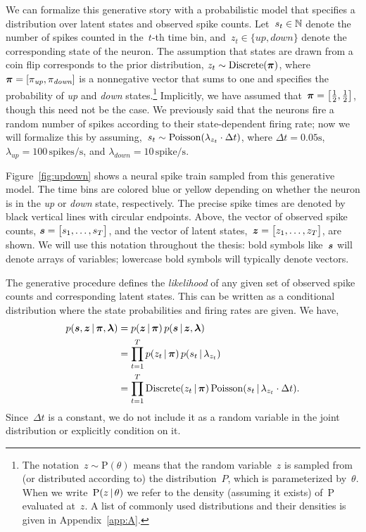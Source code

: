 \sloppy We can formalize this generative story with a probabilistic
model that specifies a distribution over latent states and observed
spike counts. Let~$s_t \in \mathbb{N}$ denote the number of spikes
counted in the~$t$-th time bin, and~$z_t \in \{\textit{up},
\textit{down}\}$ denote the corresponding state of the neuron. The
assumption that states are drawn from a coin flip corresponds to the
prior distribution, ${z_t \sim \mathrm{Discrete}(\boldsymbol{\pi})}$, where~${\boldsymbol{\pi} =
  [\pi_{\textit{up}}, \pi_{\textit{down}}]}$ is a nonnegative vector
that sums to one and specifies the probability of \textit{up} and
\textit{down} states.\footnote{The notation~${z \sim
    \mathrm{P}(\theta)}$ means that the random variable~$z$ is sampled
  from (or distributed according to) the distribution~$P$, which is
  parameterized by~$\theta$. When we write~${\mathrm{P}(z \,|\,
    \theta)}$ we refer to the density (assuming it exists)
  of~$\mathrm{P}$ evaluated at~$z$.  A list of commonly used
  distributions and their densities is given in Appendix~\ref{app:A}.}
Implicitly, we have assumed that~${\boldsymbol{\pi}=\big[\tfrac{1}{2},
    \tfrac{1}{2} \big]}$, though this need not be the case.  We
previously said that the neurons fire a random number of spikes
according to their state-dependent firing rate; now we will formalize
this by assuming,~${s_{t} \sim \mathrm{Poisson}(\lambda_{z_t} \cdot \Delta
  t)}$, where ${\Delta t = 0.05\text{s}}$, ${\lambda_{\textit{up}} =
  100\,\text{spikes/s}}$, and ${\lambda_{\textit{down}} =
  10\,\text{spike/s}}$.

Figure~\ref{fig:updown} shows a neural spike train sampled from this
generative model. The time bins are colored blue or yellow depending
on whether the neuron is in the \textit{up} or \textit{down} state,
respectively.  The precise spike times are denoted by black vertical
lines with circular endpoints. Above, the vector of observed spike
counts, ${\boldsymbol{s} = \big[s_1, \ldots, s_T \big]}$, and the vector of
latent states,~${\boldsymbol{z} = \big[z_1, \ldots, z_T \big]}$, are shown.  We
will use this notation throughout the thesis: bold symbols like~$\boldsymbol{s}$
will denote arrays of variables; lowercase bold symbols will
typically denote vectors.

The generative procedure defines the \emph{likelihood} of any given
set of observed spike counts and corresponding latent states. This can
be written as a conditional distribution where the state probabilities
and firing rates are given. We have,
\begin{align}
  \label{eq:lkhd_chain_rule}
  p(\boldsymbol{s}, \boldsymbol{z} \,|\, \boldsymbol{\pi}, \boldsymbol{\lambda}) 
  &= p(\boldsymbol{z} \,|\, \boldsymbol{\pi}) \, p(\boldsymbol{s} \,|\, \boldsymbol{z}, \boldsymbol{\lambda}) \\
  \label{eq:lkhd_factorized}
  &= \prod_{t=1}^T p(z_t \,|\, \boldsymbol{\pi}) \, p(s_t \,|\, \lambda_{z_t}) \\
  \label{eq:lkhd_factorized_forms}
  &= \prod_{t=1}^T \mathrm{Discrete}(z_t \,|\, \boldsymbol{\pi}) \, \mathrm{Poisson}(s_t \,|\, \lambda_{z_t} \cdot \Delta t).
\end{align}
Since~$\Delta t$ is a constant, we do not include it as a random
variable in the joint distribution or explicitly condition on it.

